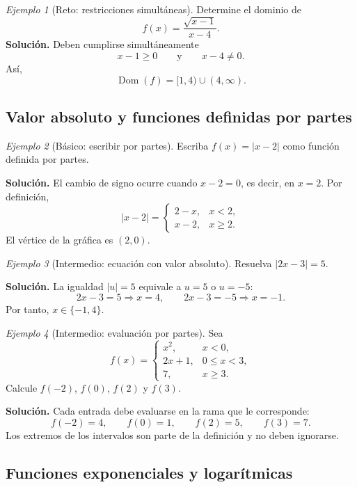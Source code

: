 \documentclass[12pt]{article}
\theoremstyle{remark}
\newtheorem{ejemplo}{Ejemplo}[section]
\newcommand{\Dom}{\operatorname{Dom}}
\begin{document}
\begin{ejemplo}[Reto: restricciones simultáneas]
Determine el dominio de
\[
f(x)=\frac{\sqrt{x-1}}{x-4}.
\]
\textbf{Solución.} Deben cumplirse simultáneamente
\[
x-1\ge0
\qquad\text{y}\qquad
x-4\neq0.
\]
Así,
\[
\boxed{\Dom(f)=[1,4)\cup(4,\infty)}.
\]
\end{ejemplo}

\subsection{Valor absoluto y funciones definidas por partes}

\begin{ejemplo}[Básico: escribir por partes]
Escriba $f(x)=|x-2|$ como función definida por partes.

\textbf{Solución.} El cambio de signo ocurre cuando $x-2=0$, es decir, en $x=2$. Por definición,
\[
\boxed{
|x-2|=
\begin{cases}
2-x,&x<2,\\
x-2,&x\ge2.
\end{cases}}
\]
El vértice de la gráfica es $(2,0)$.
\end{ejemplo}

\begin{ejemplo}[Intermedio: ecuación con valor absoluto]
Resuelva $|2x-3|=5$.

\textbf{Solución.} La igualdad $|u|=5$ equivale a $u=5$ o $u=-5$:
\[
2x-3=5\Longrightarrow x=4,
\qquad
2x-3=-5\Longrightarrow x=-1.
\]
Por tanto, $\boxed{x\in\{-1,4\}}$.
\end{ejemplo}

\begin{ejemplo}[Intermedio: evaluación por partes]
Sea
\[
f(x)=\begin{cases}
x^2,&x<0,\\
2x+1,&0\le x<3,\\
7,&x\ge3.
\end{cases}
\]
Calcule $f(-2)$, $f(0)$, $f(2)$ y $f(3)$.

\textbf{Solución.} Cada entrada debe evaluarse en la rama que le corresponde:
\[
f(-2)=4,\qquad f(0)=1,\qquad f(2)=5,\qquad f(3)=7.
\]
Los extremos de los intervalos son parte de la definición y no deben ignorarse.
\end{ejemplo}

\subsection{Funciones exponenciales y logarítmicas}
\end{document}
